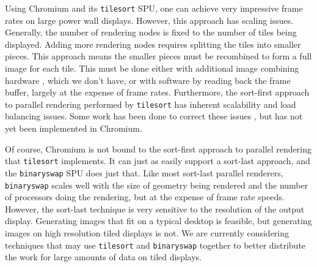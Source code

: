 \documentclass[letterpaper]{acmsiggraph}
\newcommand{\cidentifier}[1]{\texttt{#1}}
\begin{document}
  Using Chromium and its \cidentifier{tile\-sort} SPU, one can achieve very
  impressive frame rates on large power wall displays.  However, this
  approach has scaling issues.  Generally, the number of rendering nodes is
  fixed to the number of tiles being displayed.  Adding more rendering
  nodes requires splitting the tiles into smaller pieces.  This approach
  means the smaller pieces must be recombined to form a full image for each
  tile.  This must be done either with additional image combining hardware
  \cite{Stoll01}, which we don't have, or with software by reading back the
  frame buffer, largely at the expense of frame rates.  Furthermore, the
  sort-first approach to parallel rendering performed by
  \cidentifier{tile\-sort} has inherent scalability and load balancing
  issues.  Some work has been done to correct these issues
  \cite{Samanta99}, but has not yet been implemented in Chromium.

  Of course, Chromium is not bound to the sort-first approach to parallel
  rendering that \cidentifier{tile\-sort} implements.  It can just as
  easily support a sort-last approach, and the \cidentifier{binary\-swap}
  SPU does just that.  Like most sort-last parallel renderers,
  \cidentifier{binary\-swap} scales well with the size of geometry being
  rendered and the number of processors doing the rendering, but at the
  expense of frame rate speeds.  However, the sort-last technique is very
  sensitive to the resolution of the output display.  Generating images
  that fit on a typical desktop is feasible, but generating images on high
  resolution tiled displays is not.  We are currently considering
  techniques that may use \cidentifier{tile\-sort} and
  \cidentifier{binary\-swap} together to better distribute the work for
  large amounts of data on tiled displays.

\end{document}
